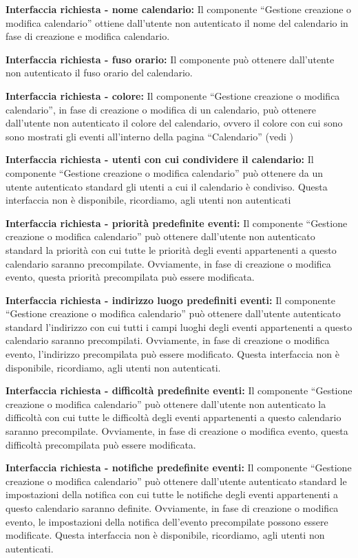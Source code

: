 \begin{listaPersonale}[]{}
    \textbf{Interfaccia richiesta - nome calendario:} Il componente “Gestione creazione o modifica calendario” ottiene dall'utente non autenticato il nome del calendario in fase di creazione e modifica calendario.

    \textbf{Interfaccia richiesta - fuso orario:} Il componente può ottenere dall'utente non autenticato il fuso orario del calendario.

    \textbf{Interfaccia richiesta - colore:} Il componente “Gestione creazione o modifica calendario”, in fase di creazione o modifica di un calendario, può ottenere dall'utente non autenticato il colore del calendario, ovvero il colore con cui sono sono mostrati gli eventi all'interno della pagina “Calendario” (vedi )

    \textbf{Interfaccia richiesta - utenti con cui condividere il calendario:} Il componente “Gestione creazione o modifica calendario” può ottenere da un utente autenticato standard gli utenti a cui il calendario è condiviso. Questa interfaccia non è disponibile, ricordiamo, agli utenti non autenticati

    \textbf{Interfaccia richiesta - priorità predefinite eventi:} Il componente “Gestione creazione o modifica calendario” può ottenere dall'utente non autenticato standard la priorità con cui tutte le priorità degli eventi appartenenti a questo calendario saranno precompilate. Ovviamente, in fase di creazione o modifica evento, questa priorità precompilata può essere modificata.

    \textbf{Interfaccia richiesta - indirizzo luogo predefiniti eventi:} Il componente “Gestione creazione o modifica calendario” può ottenere dall'utente autenticato standard l'indirizzo con cui tutti i campi luoghi degli eventi appartenenti a questo calendario saranno precompilati. Ovviamente, in fase di creazione o modifica evento, l'indirizzo precompilata può essere modificato. Questa interfaccia non è disponibile, ricordiamo, agli utenti non autenticati.

    \textbf{Interfaccia richiesta - difficoltà predefinite eventi:} Il componente “Gestione creazione o modifica calendario” può ottenere dall'utente non autenticato la difficoltà con cui tutte le difficoltà degli eventi appartenenti a questo calendario saranno precompilate. Ovviamente, in fase di creazione o modifica evento, questa difficoltà precompilata può essere modificata.

    \textbf{Interfaccia richiesta - notifiche predefinite eventi:} Il componente “Gestione creazione o modifica calendario” può ottenere dall'utente autenticato standard le impostazioni della notifica con cui tutte le notifiche degli eventi appartenenti a questo calendario saranno definite. Ovviamente, in fase di creazione o modifica evento, le impostazioni della notifica dell'evento precompilate possono essere modificate. Questa interfaccia non è disponibile, ricordiamo, agli utenti non autenticati.


\end{listaPersonale}
